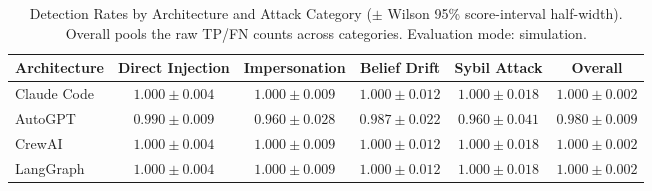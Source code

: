 \begin{table}[htbp]
\centering
\caption{Detection Rates by Architecture and Attack Category ($\pm$ Wilson 95\% score-interval half-width). Overall pools the raw TP/FN counts across categories. Evaluation mode: simulation.}
\label{tab:detection-rates}
\begin{tabular}{lccccc}
\toprule
Architecture & Direct Injection & Impersonation & Belief Drift & Sybil Attack & Overall \\
\midrule
Claude Code & $1.000 \pm 0.004$ & $1.000 \pm 0.009$ & $1.000 \pm 0.012$ & $1.000 \pm 0.018$ & $1.000 \pm 0.002$ \\
AutoGPT & $0.990 \pm 0.009$ & $0.960 \pm 0.028$ & $0.987 \pm 0.022$ & $0.960 \pm 0.041$ & $0.980 \pm 0.009$ \\
CrewAI & $1.000 \pm 0.004$ & $1.000 \pm 0.009$ & $1.000 \pm 0.012$ & $1.000 \pm 0.018$ & $1.000 \pm 0.002$ \\
LangGraph & $1.000 \pm 0.004$ & $1.000 \pm 0.009$ & $1.000 \pm 0.012$ & $1.000 \pm 0.018$ & $1.000 \pm 0.002$ \\
\bottomrule
\end{tabular}
\end{table}